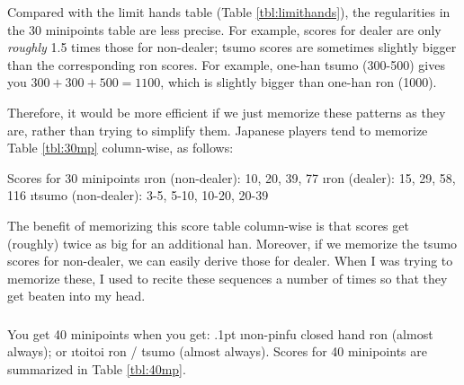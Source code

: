\bigskip
Compared with the limit hands table (Table \ref{tbl:limithands}), the regularities in the 30 minipoints table are less precise. For example, scores for dealer are only \emph{roughly} 1.5 times those for non-dealer; {\jap tsumo} scores are sometimes slightly bigger than the corresponding {\jap ron} scores. For example, one-{\jap han tsumo} (300-500) gives you $300+300+500 = 1100$, which is slightly bigger than one-{\jap han ron} (1000). 

\bigskip
Therefore, it would be more efficient if we just memorize these patterns as they are, rather than trying to simplify them. Japanese players tend to memorize Table \ref{tbl:30mp} column-wise, as follows:

\bigskip
\begin{itembox}[c]{Scores for 30 minipoints}
\bi
\i {\jap ron} (non-dealer): 10, 20, 39, 77 
\i {\jap ron} (dealer): 15, 29, 58, 116 
\i {\jap tsumo} (non-dealer): 3-5, 5-10, 10-20, 20-39
\ei
\end{itembox}

\bigskip
\noindent
The benefit of memorizing this score table column-wise is that scores get (roughly) twice as big for an additional {\jap han}. Moreover, if we memorize the {\jap tsumo} scores for non-dealer, we can easily derive those for dealer. 
When I was trying to memorize these, I used to recite these sequences a number of times so that they get beaten into my head. 

\subsubsection{}
\noindent You get 40 minipoints when you get:
\bi\itemsep.1pt
\i non-{\jap pinfu} closed hand {\jap ron} (almost always); or
\i {\jap toitoi} {\jap ron} / {\jap tsumo} (almost always).
\ei
Scores for 40 minipoints are summarized in Table \ref{tbl:40mp}. 

